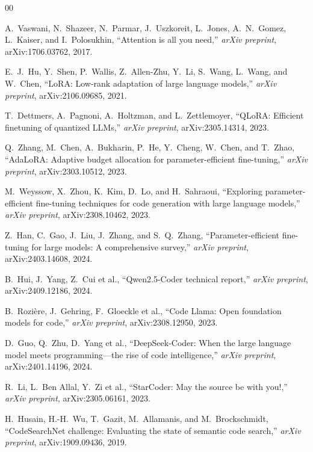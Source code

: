 \begin{thebibliography}{00}

A.~Vaswani, N.~Shazeer, N.~Parmar, J.~Uszkoreit, L.~Jones,
A.~N.~Gomez, L.~Kaiser, and I.~Polosukhin,
``Attention is all you need,''
\textit{arXiv preprint}, arXiv:1706.03762, 2017.

E.~J.~Hu, Y.~Shen, P.~Wallis, Z.~Allen-Zhu, Y.~Li, S.~Wang,
L.~Wang, and W.~Chen,
``LoRA: Low-rank adaptation of large language models,''
\textit{arXiv preprint}, arXiv:2106.09685, 2021.

T.~Dettmers, A.~Pagnoni, A.~Holtzman, and L.~Zettlemoyer,
``QLoRA: Efficient finetuning of quantized LLMs,''
\textit{arXiv preprint}, arXiv:2305.14314, 2023.

Q.~Zhang, M.~Chen, A.~Bukharin, P.~He, Y.~Cheng, W.~Chen,
and T.~Zhao,
``AdaLoRA: Adaptive budget allocation for parameter-efficient
fine-tuning,''
\textit{arXiv preprint}, arXiv:2303.10512, 2023.

M.~Weyssow, X.~Zhou, K.~Kim, D.~Lo, and H.~Sahraoui,
``Exploring parameter-efficient fine-tuning techniques for code
generation with large language models,''
\textit{arXiv preprint}, arXiv:2308.10462, 2023.

Z.~Han, C.~Gao, J.~Liu, J.~Zhang, and S.~Q.~Zhang,
``Parameter-efficient fine-tuning for large models: A comprehensive
survey,''
\textit{arXiv preprint}, arXiv:2403.14608, 2024.

B.~Hui, J.~Yang, Z.~Cui et al.,
``Qwen2.5-Coder technical report,''
\textit{arXiv preprint}, arXiv:2409.12186, 2024.

B.~Rozi\`{e}re, J.~Gehring, F.~Gloeckle et al.,
``Code Llama: Open foundation models for code,''
\textit{arXiv preprint}, arXiv:2308.12950, 2023.

D.~Guo, Q.~Zhu, D.~Yang et al.,
``DeepSeek-Coder: When the large language model meets
programming---the rise of code intelligence,''
\textit{arXiv preprint}, arXiv:2401.14196, 2024.

R.~Li, L.~Ben Allal, Y.~Zi et al.,
``StarCoder: May the source be with you!,''
\textit{arXiv preprint}, arXiv:2305.06161, 2023.

H.~Husain, H.-H.~Wu, T.~Gazit, M.~Allamanis, and
M.~Brockschmidt,
``CodeSearchNet challenge: Evaluating the state of semantic code
search,''
\textit{arXiv preprint}, arXiv:1909.09436, 2019.


\end{thebibliography}
